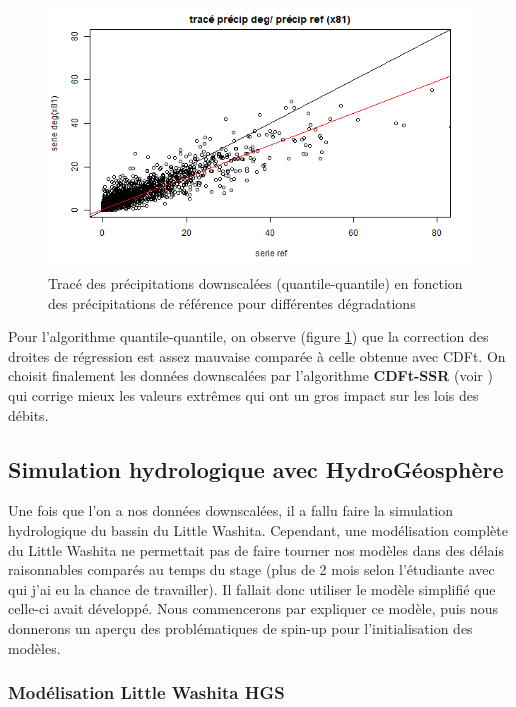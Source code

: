 \documentclass[a4paper,11pt]{article}
\numberwithin{equation}{section}
\begin{document}
\begin{figure}[H]
\begin{minipage}[b]{0.4\linewidth}
	\end{minipage}\hfill
	\begin{minipage}[b]{0.4\linewidth}	
		\centering \includegraphics[scale=0.4]{images/pr_4_dg.png}
	\end{minipage}
	\caption{Tracé des précipitations downscalées (quantile-quantile) en fonction des précipitations de référence pour différentes dégradations}
	\label{fig-precip-QQ}
\end{figure} 


Pour l'algorithme quantile-quantile, on observe (figure \ref{fig-precip-QQ}) que la correction des droites de régression est assez mauvaise comparée à celle obtenue avec CDFt. On choisit finalement les données downscalées par l'algorithme \textbf{CDFt-SSR} (voir \cite{vrac2016bias}) qui corrige mieux les valeurs extrêmes qui ont un gros impact sur les lois des débits.

\subsection{Simulation hydrologique avec HydroGéosphère}

Une fois que l'on a nos données downscalées, il a fallu faire la simulation hydrologique du bassin du Little Washita. Cependant, une modélisation complète du Little Washita ne permettait pas de faire tourner nos modèles dans des délais raisonnables comparés au temps du stage (plus de 2 mois selon l'étudiante avec qui j'ai eu la chance de travailler). Il fallait donc utiliser le modèle simplifié que celle-ci avait développé. Nous commencerons par expliquer ce modèle, puis nous donnerons un aperçu des problématiques de spin-up pour l'initialisation des modèles.

\subsubsection{Modélisation Little Washita HGS}
\end{document}
